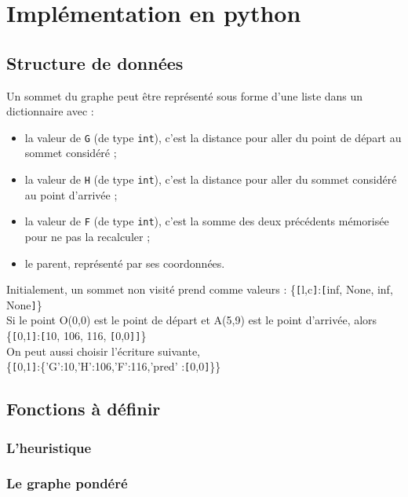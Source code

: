 \section{Implémentation en python}

\subsection{Structure de données}

Un sommet du graphe peut être représenté sous forme d'une liste dans un dictionnaire avec :
\begin{itemize}
\item la valeur de \texttt{G} (de type \texttt{int}), c'est la distance pour aller du point de départ au sommet considéré ;
\item la valeur de \texttt{H} (de type \texttt{int}), c'est la distance pour aller du sommet considéré au point d'arrivée ;
\item la valeur de \texttt{F} (de type \texttt{int}), c'est la somme des deux précédents mémorisée pour ne pas la recalculer ;
\item le parent, représenté par ses coordonnées.
\end{itemize}

Initialement, un sommet non visité prend comme valeurs :
\{\verb![!l,c\verb!]!:\verb![!inf, None, inf, None\verb!]!\}\\
Si le point O(0,0) est le point de départ et A(5,9) est le point d'arrivée, alors\\
\{\verb![!0,1\verb!]!:\verb![!10, 106, 116, \verb![!0,0\verb!]!\verb!]!\}\\
On peut aussi choisir l'écriture suivante,\\
\{\verb![!0,1\verb!]!:\{'G':10,'H':106,'F':116,'pred' :\verb![!0,0\verb!]!\}\}


\newpage
\subsection{Fonctions à définir}
\subsubsection{L'heuristique}

\vspace{10cm}



\subsubsection{Le graphe pondéré}

